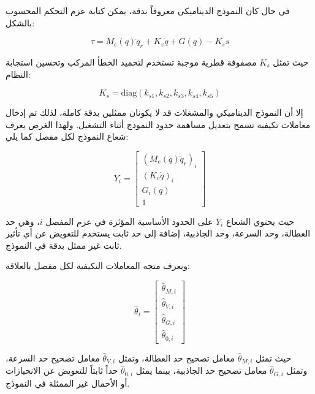 في حال كان النموذج الديناميكي معروفاً بدقة، يمكن كتابة عزم التحكم المحسوب بالشكل:

\begin{equation}
\tau
=
M_e(q)\ddot{q}_r
+
K_v\dot{q}
+
G(q)
-
K_s s
\label{eq:actc_nominal_computed_torque}
\end{equation}

حيث تمثل \(K_s\) مصفوفة قطرية موجبة تستخدم لتخميد الخطأ المركب وتحسين استجابة النظام:

\begin{equation}
K_s=
\mathrm{diag}
\left(
k_{s1},
k_{s2},
k_{s3},
k_{s4},
k_{s5}
\right)
\label{eq:actc_Ks_matrix}
\end{equation}

إلا أن النموذج الديناميكي والمشغلات قد لا يكونان ممثلين بدقة كاملة، لذلك تم إدخال معاملات تكيفية تسمح بتعديل مساهمة حدود النموذج أثناء التشغيل. ولهذا الغرض يعرف شعاع النموذج لكل مفصل كما يلي:

\begin{equation}
Y_i
=
\begin{bmatrix}
\left(M_e(q)\ddot{q}_r\right)_i\\
\left(K_v\dot{q}\right)_i\\
G_i(q)\\
1
\end{bmatrix}
\label{eq:actc_regressor_vector}
\end{equation}

حيث يحتوي الشعاع \(Y_i\) على الحدود الأساسية المؤثرة في عزم المفصل \(i\)، وهي حد العطالة، وحد السرعة، وحد الجاذبية، إضافة إلى حد ثابت يستخدم للتعويض عن أي تأثير ثابت غير ممثل بدقة في النموذج.

ويعرف متجه المعاملات التكيفية لكل مفصل بالعلاقة:

\begin{equation}
\hat{\theta}_i
=
\begin{bmatrix}
\hat{\theta}_{M,i}\\
\hat{\theta}_{V,i}\\
\hat{\theta}_{G,i}\\
\hat{\theta}_{0,i}
\end{bmatrix}
\label{eq:actc_adaptive_parameters}
\end{equation}

حيث تمثل \(\hat{\theta}_{M,i}\) معامل تصحيح حد العطالة، وتمثل \(\hat{\theta}_{V,i}\) معامل تصحيح حد السرعة، وتمثل \(\hat{\theta}_{G,i}\) معامل تصحيح حد الجاذبية، بينما يمثل \(\hat{\theta}_{0,i}\) حداً ثابتاً للتعويض عن الانحيازات أو الأحمال غير الممثلة في النموذج.

